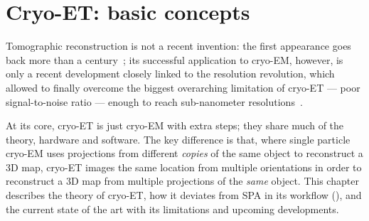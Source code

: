 \localtableofcontents

\section{Cryo-ET: basic concepts}

Tomographic reconstruction is not a recent invention: the first appearance goes back more than a century~\cite{jDeterminationFunctionsTheir1917}; its successful application to cryo-EM, however, is only a recent development closely linked to the resolution revolution, which allowed to finally overcome the biggest overarching limitation of cryo-ET --- poor signal-to-noise ratio --- enough to reach sub-nanometer resolutions~\cite{lucicCryoelectronTomographyChallenge2013,turkPromiseChallengesCryoelectron2020}.

At its core, cryo-ET is just cryo-EM with extra steps; they share much of the theory, hardware and software.
The key difference is that, where single particle cryo-EM uses projections from different \textit{copies} of the same object to reconstruct a 3D map, cryo-ET images the same location from multiple orientations in order to reconstruct a 3D map from multiple projections of the \textit{same} object.
This chapter describes the theory of cryo-ET, how it deviates from SPA in its workflow (), and the current state of the art with its limitations and upcoming developments.

